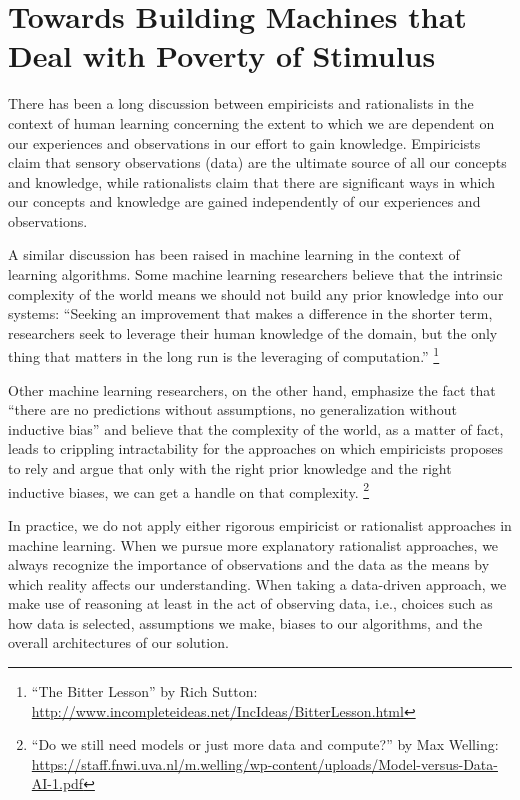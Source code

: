 \section{Towards Building Machines that Deal with Poverty of Stimulus}

There has been a long discussion between empiricists and rationalists in the context of human learning concerning the extent to which we are dependent on our experiences and observations in our effort to gain knowledge\citep{markie2004rationalism}.  
%
Empiricists claim that sensory observations (data) are the ultimate source of all our concepts and knowledge, while rationalists claim that there are significant ways in which our concepts and knowledge are gained independently of our experiences and observations. 

A similar discussion has been raised in machine learning in the context of learning algorithms.
%
Some machine learning researchers believe that the intrinsic complexity of the world means we should not build any prior knowledge into our systems: ``Seeking an improvement that makes a difference in the shorter term, researchers seek to leverage their human knowledge of the domain, but the only thing that matters in the long run is the leveraging of computation.''%
\footnote{``The Bitter Lesson'' by Rich Sutton: \url{http://www.incompleteideas.net/IncIdeas/BitterLesson.html}}

Other machine learning researchers, on the other hand, emphasize the fact that ``there are no predictions without assumptions, no generalization without inductive bias'' and believe that the complexity of the world, as a matter of fact, leads to crippling intractability for the approaches on which empiricists proposes to rely and argue that only with the right prior knowledge and the right inductive biases, we can get a handle on that complexity.
\footnote{``Do we still need models or just more data and compute?'' by Max Welling: \url{https://staff.fnwi.uva.nl/m.welling/wp-content/uploads/Model-versus-Data-AI-1.pdf}}

In practice, we do not apply either rigorous empiricist or rationalist approaches in machine learning.  When we pursue more explanatory rationalist approaches, we always recognize the importance of observations and the data as the means by which reality affects our understanding.  When taking a data-driven approach, we make use of reasoning at least in the act of observing data, i.e., choices such as how data is selected, assumptions we make, biases to our algorithms, and the overall architectures of our solution. 

